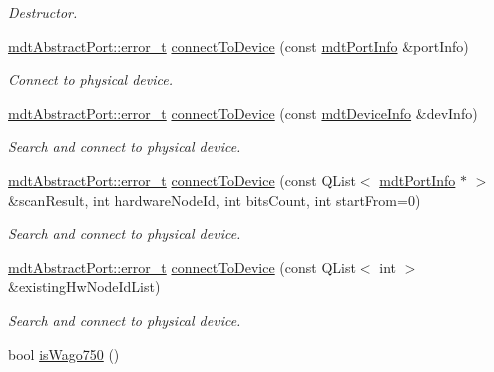 \begin{DoxyCompactItemize}
\begin{DoxyCompactList}\small\item\em Destructor. \end{DoxyCompactList}\item 
\hyperlink{classmdt_abstract_port_ad4121bb930c95887e77f8bafa065a85e}{mdtAbstractPort::error\_\-t} \hyperlink{classmdt_device_modbus_wago_ac15c95cee8dec98609278d0e0ab2b3ce}{connectToDevice} (const \hyperlink{classmdt_port_info}{mdtPortInfo} \&portInfo)
\begin{DoxyCompactList}\small\item\em Connect to physical device. \end{DoxyCompactList}\item 
\hyperlink{classmdt_abstract_port_ad4121bb930c95887e77f8bafa065a85e}{mdtAbstractPort::error\_\-t} \hyperlink{classmdt_device_modbus_wago_a025f0411a708a529054a0e3c0b6461cd}{connectToDevice} (const \hyperlink{classmdt_device_info}{mdtDeviceInfo} \&devInfo)
\begin{DoxyCompactList}\small\item\em Search and connect to physical device. \end{DoxyCompactList}\item 
\hyperlink{classmdt_abstract_port_ad4121bb930c95887e77f8bafa065a85e}{mdtAbstractPort::error\_\-t} \hyperlink{classmdt_device_modbus_wago_a12ad1f1ef34b16be5903d1d6232a7c6d}{connectToDevice} (const QList$<$ \hyperlink{classmdt_port_info}{mdtPortInfo} $\ast$ $>$ \&scanResult, int hardwareNodeId, int bitsCount, int startFrom=0)
\begin{DoxyCompactList}\small\item\em Search and connect to physical device. \end{DoxyCompactList}\item 
\hyperlink{classmdt_abstract_port_ad4121bb930c95887e77f8bafa065a85e}{mdtAbstractPort::error\_\-t} \hyperlink{classmdt_device_modbus_wago_aeebc68749c2e22beacd18d85cc0b313a}{connectToDevice} (const QList$<$ int $>$ \&existingHwNodeIdList)
\begin{DoxyCompactList}\small\item\em Search and connect to physical device. \end{DoxyCompactList}\item 
\hypertarget{classmdt_device_modbus_wago_a6f01ba89d90ddfbcaa0cbda1885d22f1}{
bool \hyperlink{classmdt_device_modbus_wago_a6f01ba89d90ddfbcaa0cbda1885d22f1}{isWago750} ()}
\label{classmdt_device_modbus_wago_a6f01ba89d90ddfbcaa0cbda1885d22f1}


\end{DoxyCompactItemize}
